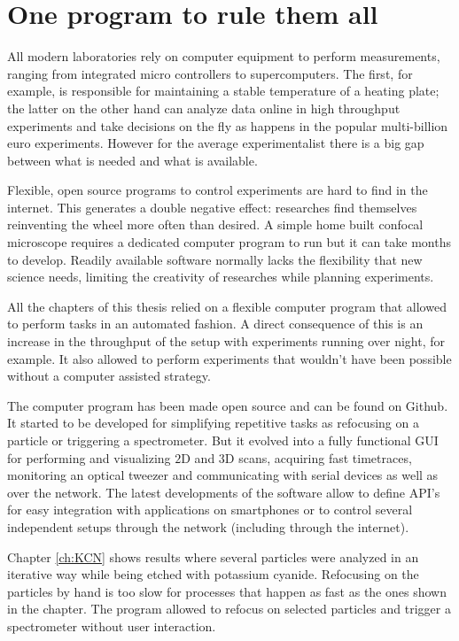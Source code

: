 \section{One program to rule them all}
All modern laboratories rely on computer equipment to perform measurements,
ranging from integrated micro controllers to supercomputers. The first, for
example, is responsible for maintaining a stable temperature of a heating plate;
the latter on the other hand can analyze data online in high throughput
experiments and take decisions on the fly as happens in the popular
multi-billion euro experiments. However for the average experimentalist there is
a big gap between what is needed and what is available.

Flexible, open source programs to control experiments are hard to find in the
internet. This generates a double negative effect: researches find themselves
reinventing the wheel more often than desired. A simple home built confocal
microscope requires a dedicated computer program to run but it can take months
to develop. Readily available software normally lacks the flexibility that new
science needs, limiting the creativity of researches while planning
experiments.

All the chapters of this thesis relied on a flexible computer program that
allowed to perform tasks in an automated fashion. A direct consequence of this
is an increase in the throughput of the setup with experiments running over
night, for example. It also allowed to perform experiments that wouldn't have
been possible without a computer assisted strategy. 

The computer program has been made open source and can be found on Github. It
started to be developed for simplifying repetitive tasks as refocusing on a
particle or triggering a spectrometer. But it evolved into a fully functional
GUI for performing and visualizing $2$D and $3$D scans, acquiring fast
timetraces, monitoring an optical tweezer and communicating with serial devices
as well as over the network. The latest developments of the software allow to
define API's for easy integration with applications on smartphones or to control
several independent setups through the network (including through the internet).

Chapter \ref{ch:KCN} shows results where several particles were analyzed in an
iterative way while being etched with potassium cyanide. Refocusing on the
particles by hand is too slow for processes that happen as fast as the ones
shown in the chapter. The program allowed to refocus on selected particles and
trigger a spectrometer without user interaction. 

